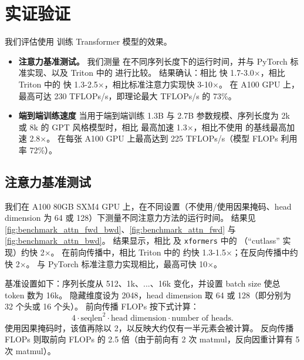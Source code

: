 \section{实证验证}
\label{sec:experiments}

我们评估使用 \sysname 训练 Transformer 模型的效果。
\begin{itemize}[itemsep=0.1pt,topsep=0pt,leftmargin=*]
  \item \textbf{注意力基准测试。}
  我们测量 \sysname 在不同序列长度下的运行时间，并与 PyTorch 标准实现、\sysnameone 以及 Triton 中的 \sysnameone 进行比较。
  结果确认：\sysname 相比 \sysnameone 快 1.7-3.0$\times$，相比 Triton 中的 \sysnameone 快 1.3-2.5$\times$，相比标准注意力实现快 3-10$\times$。
  在 A100 GPU 上，\sysname 最高可达 230 TFLOPs/s，即理论最大 TFLOPs/s 的 73\%。
  \item \textbf{端到端训练速度}
  当用于端到端训练 1.3B 与 2.7B 参数规模、序列长度为 2k 或 8k 的 GPT 风格模型时，\sysname 相比 \sysnameone 最高加速 1.3$\times$，相比不使用 \sysnameone 的基线最高加速 2.8$\times$。
  \sysname 在每张 A100 GPU 上最高达到 225 TFLOPs/s（模型 FLOPs 利用率 72\%）。
\end{itemize}

\subsection{注意力基准测试}
\label{subsec:benchmark_attn}

我们在 A100 80GB SXM4 GPU 上，在不同设置（不使用/使用因果掩码、head dimension 为 64 或 128）下测量不同注意力方法的运行时间。
结果见 \cref{fig:benchmark_attn_fwd_bwd}、\cref{fig:benchmark_attn_fwd}
与 \cref{fig:benchmark_attn_bwd}。
结果显示，\sysname 相比 \sysnameone 及 \texttt{xformers} 中的 \sysnameone（“cutlass” 实现）约快 2$\times$。
在前向传播中，\sysname 相比 Triton 中的 \sysnameone 约快 1.3-1.5$\times$；在反向传播中约快 2$\times$。
与 PyTorch 标准注意力实现相比，\sysname 最高可快 10$\times$。

基准设置如下：序列长度从 512、1k、...、16k 变化，并设置 batch size 使总 token 数为 16k。
隐藏维度设为 2048，head dimension 取 64 或 128（即分别为 32 个头或 16 个头）。
前向传播 FLOPs 按下式计算：
\begin{equation*}
  4 \cdot \text{seqlen}^2 \cdot \text{head dimension} \cdot \text{number of heads}.
\end{equation*}
使用因果掩码时，该值再除以 2，以反映大约仅有一半元素会被计算。
反向传播 FLOPs 则取前向 FLOPs 的 2.5 倍（由于前向有 2 次 matmul，反向因重计算有 5 次 matmul）。

